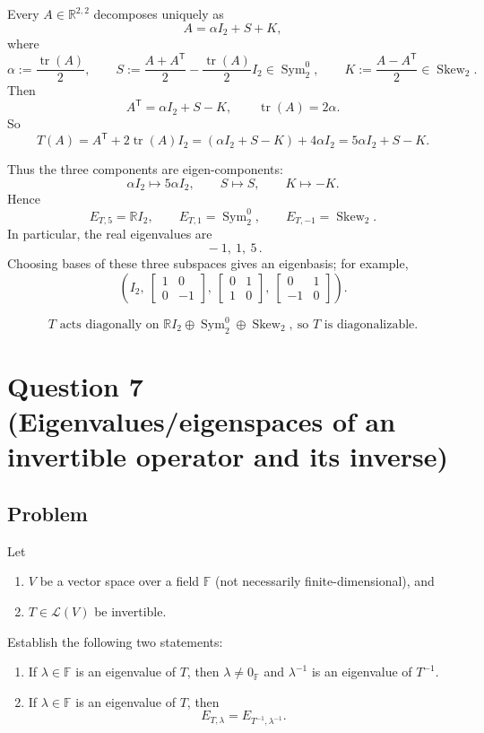 \documentclass[12pt]{article}
\newcommand{\R}{\mathbb{R}}
\newcommand{\F}{\mathbb{F}}
\newcommand{\cL}{\mathcal{L}}
\DeclareMathOperator{\tr}{tr}
\DeclareMathOperator{\Sym}{Sym}     %
\DeclareMathOperator{\Skew}{Skew}   %
\begin{document}
Every \(A\in\R^{2,2}\) decomposes uniquely as
\[
A=\alpha I_2+S+K,
\]
where
\[
\alpha:=\frac{\tr(A)}{2},\qquad
S:=\frac{A+A^{\mathsf T}}2-\frac{\tr(A)}2 I_2\in \Sym_2^0,
\qquad
K:=\frac{A-A^{\mathsf T}}2\in\Skew_2.
\]
Then
\[
A^{\mathsf T}=\alpha I_2+S-K,
\qquad
\tr(A)=2\alpha.
\]
So
\[
T(A)=A^{\mathsf T}+2\tr(A)I_2
=(\alpha I_2+S-K)+4\alpha I_2
=5\alpha I_2+S-K.
\]

Thus the three components are eigen-components:
\[
\alpha I_2 \mapsto 5\alpha I_2,\qquad
S\mapsto S,\qquad
K\mapsto -K.
\]
Hence
\[
E_{T,5}=\R I_2,\qquad
E_{T,1}=\Sym_2^0,\qquad
E_{T,-1}=\Skew_2.
\]
In particular, the real eigenvalues are
\[
\boxed{\, -1,\ 1,\ 5 \, }.
\]
Choosing bases of these three subspaces gives an eigenbasis; for example,
\[
\left(
I_2,\
\begin{bmatrix}1&0\\0&-1\end{bmatrix},\
\begin{bmatrix}0&1\\1&0\end{bmatrix},\
\begin{bmatrix}0&1\\-1&0\end{bmatrix}
\right).
\]

\[
\boxed{\,\text{$T$ acts diagonally on } \R I_2\oplus \Sym_2^0\oplus \Skew_2,\ \text{so $T$ is diagonalizable.}\,}
\]

\newpage
\section{Question 7 (Eigenvalues/eigenspaces of an invertible operator and its inverse)}

\subsection{Problem}
Let
\begin{enumerate}[label=(\roman*)]
\item $V$ be a vector space over a field $\F$ (not necessarily finite-dimensional), and
\item $T\in \cL(V)$ be invertible.
\end{enumerate}
Establish the following two statements:
\begin{enumerate}[label=(\arabic*)]
\item If $\lambda\in\F$ is an eigenvalue of $T$, then $\lambda\neq 0_{\F}$ and $\lambda^{-1}$ is an eigenvalue of $T^{-1}$.
\item If $\lambda\in\F$ is an eigenvalue of $T$, then
\[
E_{T,\lambda}=E_{T^{-1},\lambda^{-1}}.
\]
\end{enumerate}
\end{document}
